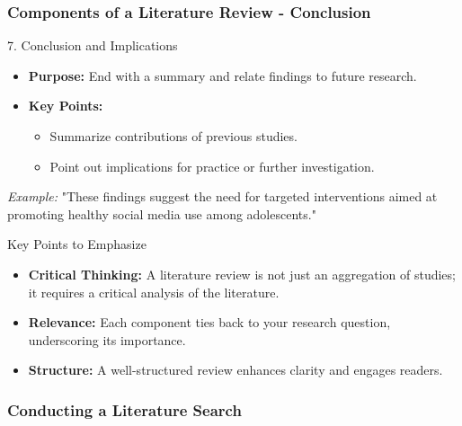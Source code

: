 \documentclass[aspectratio=169]{beamer}
\begin{document}
\begin{frame}[fragile]
    \frametitle{Components of a Literature Review - Conclusion}
    \begin{block}{7. Conclusion and Implications}
        \begin{itemize}
            \item \textbf{Purpose:} End with a summary and relate findings to future research.
            \item \textbf{Key Points:}
                \begin{itemize}
                    \item Summarize contributions of previous studies.
                    \item Point out implications for practice or further investigation.
                \end{itemize}
        \end{itemize}
        \textit{Example:} "These findings suggest the need for targeted interventions aimed at promoting healthy social media use among adolescents."
    \end{block}
    
    \begin{block}{Key Points to Emphasize}
        \begin{itemize}
            \item \textbf{Critical Thinking:} A literature review is not just an aggregation of studies; it requires a critical analysis of the literature.
            \item \textbf{Relevance:} Each component ties back to your research question, underscoring its importance.
            \item \textbf{Structure:} A well-structured review enhances clarity and engages readers.
        \end{itemize}
    \end{block}
\end{frame}

\begin{frame}[fragile]
    \frametitle{Conducting a Literature Search}
\end{frame}
\end{document}
